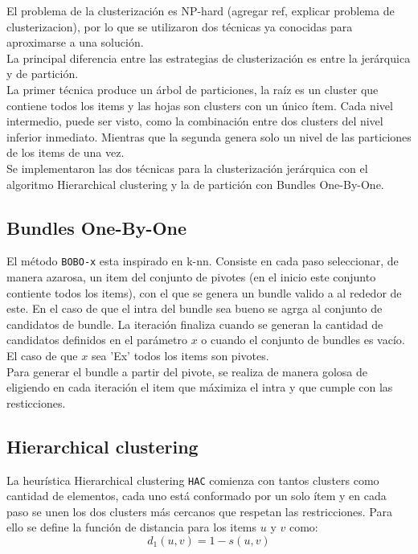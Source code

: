El problema de la clusterización es NP-hard (agregar ref, explicar problema de clusterizacion),
por lo que se utilizaron dos técnicas ya conocidas para aproximarse a una solución.\\
La principal diferencia entre las estrategias de clusterización es entre la jerárquica y de 
partición.\\
La primer técnica produce un árbol de particiones, la raíz es un cluster que contiene todos los items
y las hojas son clusters con un único ítem. Cada nivel intermedio, puede ser visto, como la 
combinación entre dos clusters del nivel inferior inmediato. Mientras que la segunda genera solo un 
nivel de las particiones de los items de una vez.\\ 
Se implementaron las dos técnicas para la clusterización jerárquica con el algoritmo
Hierarchical clustering y la de partición con Bundles One-By-One.\\

\subsection{Bundles One-By-One}
El método \texttt{BOBO-x} esta inspirado en k-nn. Consiste en cada paso seleccionar, de manera azarosa, un item del conjunto de pivotes (en el inicio este conjunto contiente todos los items),
con el que se genera un bundle valido a al rededor de este. En el caso de que el intra del bundle sea bueno se agrga al conjunto de candidatos de bundle.
La iteración finaliza cuando se generan la cantidad de candidatos definidos en el parámetro $x$ o cuando el conjunto de bundles es vacío. El caso de que $x$ sea 'Ex' todos los 
items son pivotes.\\
Para generar el bundle a partir del pivote, se realiza de manera golosa de eligiendo en cada iteración el item que
máximiza el intra y que cumple con las resticciones.\\
\subsection{Hierarchical clustering}
La heurística Hierarchical clustering \texttt{HAC} comienza con tantos clusters como cantidad de elementos, cada uno está 
conformado por un solo ítem y en cada paso se unen los dos clusters más cercanos que respetan las restricciones. 
Para ello se define la función de distancia para los items $u$ y $v$ como:\\
\begin{equation}
d_{1}(u,v) = 1 - s(u, v)
\end{equation}

